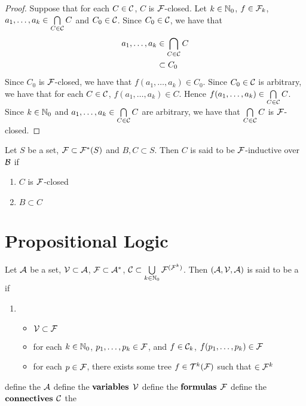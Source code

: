 \documentclass{book}
\begin{document}
	\begin{proof}
		Suppose that for each $C \in \mathcal{C}$, $C$ is  $\mathcal{F}$-closed. Let $k \in \mathbb{N}_0$, $f \in \mathcal{F}_k$, $a_1, \ldots, a_k \in \bigcap\limits_{C \in \mathcal{C}} C$ and $C_0 \in \mathcal{C}$. Since $C_0 \in \mathcal{C}$, we have that 
		\begin{align*}
			a_1, \ldots, a_k 
			& \in \bigcap_{C \in \mathcal{C}} C \\
			& \subset C_0
		\end{align*}
		Since $C_0$ is $\mathcal{F}$-closed, we have that $f(a_1, \ldots, a_k) \in C_0$. Since $C_0 \in \mathcal{C}$ is arbitrary, we have that for each $C \in \mathcal{C}$, $f(a_1, \ldots, a_k) \in C$. Hence $f(a_1, \ldots, a_k) \in \bigcap\limits_{C \in \mathcal{C}} C$. Since $k \in \mathbb{N}_0$ and $a_1, \ldots, a_k \in \bigcap\limits_{C \in \mathcal{C}} C$ are arbitrary, we have that $\bigcap\limits_{C \in \mathcal{C}} C$ is $\mathcal{F}$-closed.
	\end{proof}
	
	\begin{defn}
		Let $S$ be a set, $\mathcal{F} \subset \mathcal{F}^*(S)$ and $B, C \subset S$. Then $C$ is said to be $\mathcal{F}$-inductive over $\mathcal{B}$ if 
		\begin{enumerate}
			\item $C$ is $\mathcal{F}$-closed
			\item $B \subset C$
		\end{enumerate}
	\end{defn}
	
	
	\chapter{Propositional Logic}
	\begin{defn} 
		Let $\mathcal{A}$ be a set, $\mathcal{V} \subset \mathcal{A}$, $\mathcal{F} \subset \mathcal{A}^*$, $\mathcal{C} \subset \bigcup\limits_{k \in \mathbb{N}_0} \mathcal{F}^{(\mathcal{F}^k)}$. Then $(\mathcal{A}, \mathcal{V}, \mathcal{A})$ is said to be a  
		if 
		\begin{enumerate}
			\item 
			\begin{itemize}
				\item $\mathcal{V} \subset \mathcal{F}$
				\item for each $k \in \mathbb{N}_0$, $p_1, \ldots, p_k \in \mathcal{F}$, and $f \in \mathcal{C}_k$, $f(p_1, \ldots, p_k) \in \mathcal{F}$
				\item for each $p \in \mathcal{F}$, there exists some tree $f \in \mathcal{T}^k(\mathcal{F})$ such that $ \in \mathcal{F}^{k}$ 
			\end{itemize}
		\end{enumerate}
		define the  $\mathcal{A}$
		define the $\textbf{variables}$ $\mathcal{V}$
		define the $\textbf{formulas}$ $\mathcal{F}$
		define the $\textbf{connectives}$ $\mathcal{C}$
		the 
	\end{defn}
	
\end{document}

